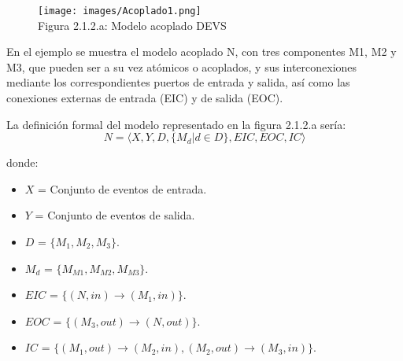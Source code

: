 \begin{figure}[H]
\begin{center}
\texttt{[image: images/Acoplado1.png]}
\\[0.5cm]
Figura 2.1.2.a: Modelo acoplado DEVS
\end{center}
\end{figure}

En el ejemplo se muestra el modelo acoplado N, con tres componentes M1, M2 y M3, que pueden ser a su vez atómicos o acoplados, y sus interconexiones mediante los correspondientes puertos de entrada y salida, así como las conexiones externas de entrada (EIC) y de salida (EOC).

La definición formal del modelo representado en la figura 2.1.2.a sería:
\begin{equation}\label{eq:DevsAcoplado}
N = \langle X,Y,D,\{M_{d}|d \in D\},EIC,EOC,IC\rangle
\end{equation}

\noindent donde:

\begin{itemize}
\item $X$ = Conjunto de eventos de entrada.	
\item $Y$ = Conjunto de eventos de salida.
\item $D$ = $\{ M_{1},M_{2},M_{3} \}$.
\item $M_{d}$ = $\{ M_{M1},M_{M2},M_{M3} \}$.
\item $EIC$ = $\{ (N,in) \rightarrow (M_{1},in) \}$.
\item $EOC$ = $\{ (M_{3},out) \rightarrow (N,out) \}$.
\item $IC$ = $\{ (M_{1},out) \rightarrow (M_{2},in),(M_{2},out) \rightarrow (M_{3},in) \}$.
\end{itemize}






